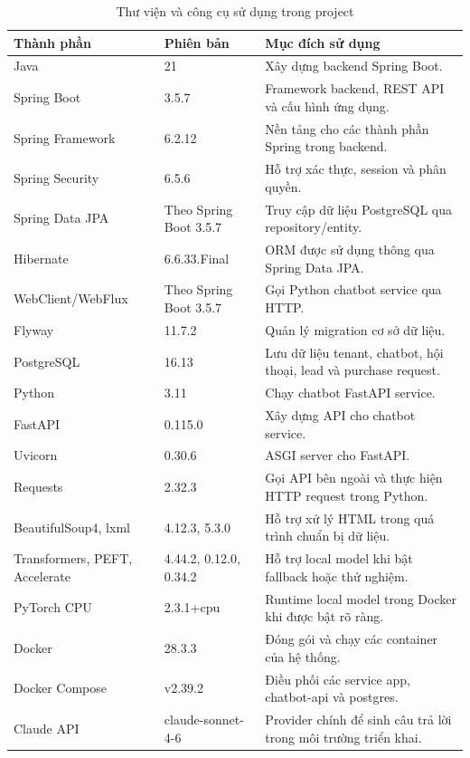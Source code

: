 \documentclass[../DoAn.tex]{subfiles}
\begin{document}
\begin{table}[H]
\centering
\caption{Thư viện và công cụ sử dụng trong project}
\label{tab:ch4-tools-libraries}
\begin{tabular}{|p{}|p{}|p{}|}
\hline
\textbf{Thành phần} & \textbf{Phiên bản} & \textbf{Mục đích sử dụng} \\
\hline
Java & 21 & Xây dựng backend Spring Boot. \\
\hline
Spring Boot & 3.5.7 & Framework backend, REST API và cấu hình ứng dụng. \\
\hline
Spring Framework & 6.2.12 & Nền tảng cho các thành phần Spring trong backend. \\
\hline
Spring Security & 6.5.6 & Hỗ trợ xác thực, session và phân quyền. \\
\hline
Spring Data JPA & Theo Spring Boot 3.5.7 & Truy cập dữ liệu PostgreSQL qua repository/entity. \\
\hline
Hibernate & 6.6.33.Final & ORM được sử dụng thông qua Spring Data JPA. \\
\hline
WebClient/WebFlux & Theo Spring Boot 3.5.7 & Gọi Python chatbot service qua HTTP. \\
\hline
Flyway & 11.7.2 & Quản lý migration cơ sở dữ liệu. \\
\hline
PostgreSQL & 16.13 & Lưu dữ liệu tenant, chatbot, hội thoại, lead và purchase request. \\
\hline
Python & 3.11 & Chạy chatbot FastAPI service. \\
\hline
FastAPI & 0.115.0 & Xây dựng API cho chatbot service. \\
\hline
Uvicorn & 0.30.6 & ASGI server cho FastAPI. \\
\hline
Requests & 2.32.3 & Gọi API bên ngoài và thực hiện HTTP request trong Python. \\
\hline
BeautifulSoup4, lxml & 4.12.3, 5.3.0 & Hỗ trợ xử lý HTML trong quá trình chuẩn bị dữ liệu. \\
\hline
Transformers, PEFT, Accelerate & 4.44.2, 0.12.0, 0.34.2 & Hỗ trợ local model khi bật fallback hoặc thử nghiệm. \\
\hline
PyTorch CPU & 2.3.1+cpu & Runtime local model trong Docker khi được bật rõ ràng. \\
\hline
Docker & 28.3.3 & Đóng gói và chạy các container của hệ thống. \\
\hline
Docker Compose & v2.39.2 & Điều phối các service app, chatbot-api và postgres. \\
\hline
Claude API & claude-sonnet-4-6 & Provider chính để sinh câu trả lời trong môi trường triển khai. \\
\hline
\end{tabular}
\end{table}
\end{document}
